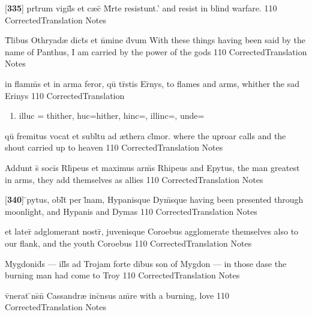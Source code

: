 \latline
  {[\textbf{335}] prt\={}rum vigil\={}s et c{\ae}c\={} M\={}rte resistunt.'}
  { and resist in blind warfare. }
  {110}
  { CorrectedTranslation }
  { Notes }


\latline
  {T\={}libus Othryad{\ae} dict\={\macron {\i}}s et n\={}mine d\={\macron {\i}}vum}
  { With these things having been said by the name of Panthus, I am carried by the power of the gods }
  {110}
  { CorrectedTranslation }
  { Notes }


\latline
  {in flamm\={}s et in arma feror, qu\={} tr\={\macron {\i}}stis Er\={\macron {\i}}nys,}
  { to flames and arms, whither the sad Erinys }
  {110}
  { CorrectedTranslation }
  { \begin{enumerate}
  	\item illuc = thither, huc=hither, hinc=, illinc=, unde=
  \end{enumerate} }


\latline
  {qu\={} fremitus vocat et subl\={}tu ad {\ae}thera cl\={}mor.}
  { where the uproar calls and the shout carried up to heaven }
  {110}
  { CorrectedTranslation }
  { Notes }


\latline
  {Addunt s\={} soci\={}s Rh\={\macron {\i}}peus et maximus arm\={\macron {\i}}s}
  { Rhipeus and Epytus, the man greatest in arms, they add themselves as allies }
  {110}
  { CorrectedTranslation }
  { Notes }


\latline
  {[\textbf{340}] \={}pytus, obl\={}t\={\macron {\i}} per l\={}nam, Hypanisque Dym\={}sque}
  { having been presented through moonlight, and Hypanis and Dymas  }
  {110}
  { CorrectedTranslation }
  { Notes }

\latline
  {et later\={\macron {\i}} adglomerant nostr\={}, juvenisque Coroebus}
  { agglomerate themselves also to our flank, and the youth Coroebus }
  {110}
  { CorrectedTranslation }
  { Notes }


\latline
  {Mygdonid\={}s --- ill\={\macron {\i}}s ad Trojam forte di\={}bus}
  { son of Mygdon --- in those dase the burning man had come to Troy }
  {110}
  { CorrectedTranslation }
  { Notes }


\latline
  {v\={}nerat \={\macron {\i}}ns\={}n\={} Cassandr{\ae} inc\={}nsus am\={}re}
  { with a burning, love }
  {110}
  { CorrectedTranslation }
  { Notes }


